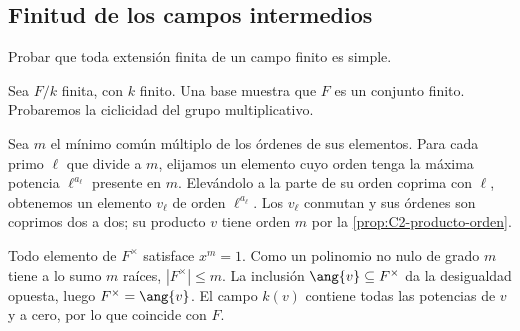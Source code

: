 \subsection{Finitud de los campos intermedios}
\begin{ejer}\label{ejer:C26-campo-finito-simple}
Probar que toda extensión finita de un campo finito es simple.
\end{ejer}
\begin{sol}
Sea $F/k$ finita, con $k$ finito. Una base muestra que $F$ es un conjunto finito. Probaremos la ciclicidad del grupo multiplicativo.

Sea $m$ el mínimo común múltiplo de los órdenes de sus elementos. Para cada primo $\ell$ que divide a $m$, elijamos un elemento cuyo orden tenga la máxima potencia $\ell^{a_\ell}$ presente en $m$. Elevándolo a la parte de su orden coprima con $\ell$, obtenemos un elemento $v_\ell$ de orden $\ell^{a_\ell}$. Los $v_\ell$ conmutan y sus órdenes son coprimos dos a dos; su producto $v$ tiene orden $m$ por la \cref{prop:C2-producto-orden}.

Todo elemento de $F^\times$ satisface $x^m=1$. Como un polinomio no nulo de grado $m$ tiene a lo sumo $m$ raíces, $|F^\times|\leq m$. La inclusión $\ang{v}\subseteq F^\times$ da la desigualdad opuesta, luego $F^\times=\ang{v}$. El campo $k(v)$ contiene todas las potencias de $v$ y a cero, por lo que coincide con $F$.
\end{sol}

